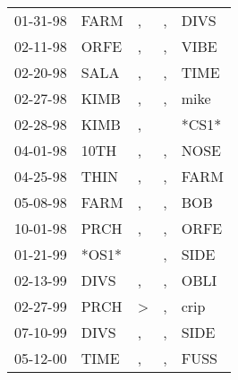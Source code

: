 \begin{supertabular}{lllll}
 01-31-98 &   FARM &             , &  , &   DIVS \\
 02-11-98 &   ORFE &             , &  , &   VIBE \\
 02-20-98 &   SALA &             , &  , &   TIME \\
 02-27-98 &   KIMB &             , &  , &   mike \\
 02-28-98 &   KIMB &             , &    &  *CS1* \\
 04-01-98 &   10TH &             , &  , &   NOSE \\
 04-25-98 &   THIN &             , &  , &   FARM \\
 05-08-98 &   FARM &             , &  , &    BOB \\
 10-01-98 &   PRCH &             , &  , &   ORFE \\
 01-21-99 &  *OS1* &               &  , &   SIDE \\
 02-13-99 &   DIVS &             , &  , &   OBLI \\
 02-27-99 &   PRCH &  \textgreater &  , &   crip \\
 07-10-99 &   DIVS &             , &  , &   SIDE \\
 05-12-00 &   TIME &             , &  , &   FUSS \\
\end{supertabular}
